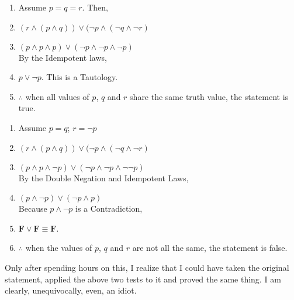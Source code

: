 \documentclass[12pt]{article}
\begin{document}
\begin{enumerate}
  \item Assume $p=q=r$. Then,
  \item $(r \land (p \land q)) \lor (\neg p \land (\neg q \land \neg r)$
  \item $(p \land p \land p) \lor (\neg p \land \neg p \land \neg p)$ \\
    By the Idempotent laws,
  \item $p \lor \neg p$. This is a Tautology.
  \item $\therefore$ when all values of $p$, $q$ and $r$ share the same truth value,
    the statement is true.
\end{enumerate}

\begin{enumerate}
  \item Assume $p=q$; $r=\neg p$
  \item $(r \land (p \land q)) \lor (\neg p \land (\neg q \land \neg r)$
  \item $(p \land p \land \neg p) \lor (\neg p \land \neg p \land \neg \neg p)$ \\
    By the Double Negation and Idempotent Laws,
  \item $(p \land \neg p) \lor (\neg p \land p)$ \\
    Because $p \land \neg p$ is a Contradiction,
  \item $\mathbf{F} \lor \mathbf{F} \equiv \mathbf{F}$.
  \item $\therefore$ when the values of $p$, $q$ and $r$ are not all the same,
    the statement is false.
\end{enumerate}

Only after spending hours on this, I realize that I could have taken the
original statement, applied the above two tests to it and proved the same
thing. I am clearly, unequivocally, even, an idiot.
\end{document}
